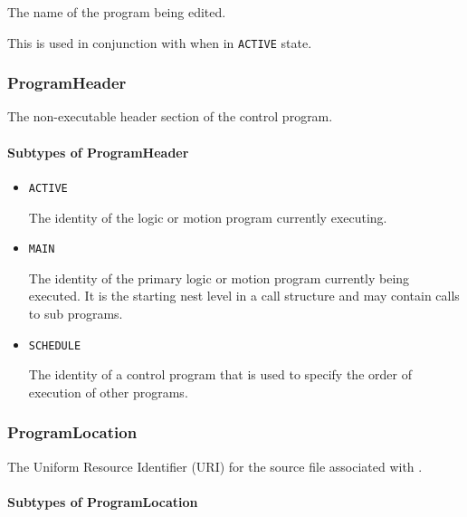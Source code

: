 The name of the program being edited. 

This is used in conjunction with  when in \texttt{ACTIVE} state. 



\subsubsection{ProgramHeader}
\label{sec:ProgramHeader}



The non-executable header section of the control program.


\paragraph{Subtypes of ProgramHeader}\mbox{}
\label{sec:Subtypes of ProgramHeader}

\begin{itemize}

\item \texttt{ACTIVE}


The identity of the logic or motion program currently executing.

\item \texttt{MAIN}


The identity of the primary logic or motion program currently being executed. It is the starting nest level in a call structure and may contain calls to sub programs.

\item \texttt{SCHEDULE}


The identity of a control program that is used to specify the order of execution of other programs.


\end{itemize}






\subsubsection{ProgramLocation}
\label{sec:ProgramLocation}



The Uniform Resource Identifier (URI) for the source file associated with .


\paragraph{Subtypes of ProgramLocation}\mbox{}
\label{sec:Subtypes of ProgramLocation}

